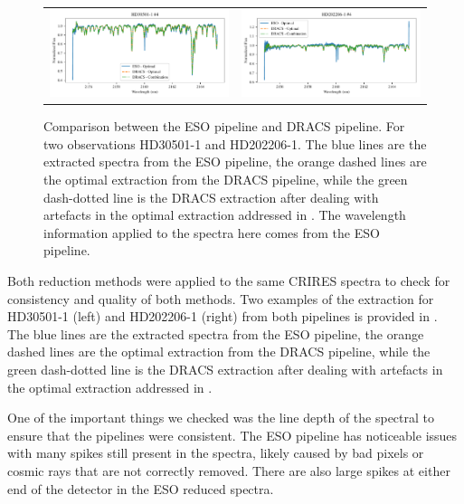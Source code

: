 \begin{figure}
\begin{tabular}{cc}
        \includegraphics[width=0.5\linewidth]{figures/reduction/pipeline_compare/pipeline_compare_HD30501-1_chip_4} & \includegraphics[width=0.5\linewidth]{figures/reduction/pipeline_compare/pipeline_compare_HD202206-1_chip_4}\\
    \end{tabular}
    \caption{Comparison between the ESO pipeline and DRACS pipeline. For two observations HD30501-1 and HD202206-1. The blue lines are the extracted spectra from the ESO pipeline, the orange dashed lines are the optimal extraction from the DRACS pipeline, while the green dash-dotted line is the DRACS extraction after dealing with artefacts in the optimal extraction addressed in . The wavelength information applied to the spectra here comes from the ESO pipeline.}
    \label{fig:reduction-comparison}
\end{figure}

Both reduction methods were applied to the same CRIRES spectra to check for consistency and quality of both methods. Two examples of the extraction for HD30501-1 (left) and HD202206-1 (right) from both pipelines is provided in . The blue lines are the extracted spectra from the ESO pipeline, the orange dashed lines are the optimal extraction from the DRACS pipeline, while the green dash-dotted line is the DRACS extraction after dealing with artefacts in the optimal extraction addressed in .

One of the important things we checked was the line depth of the spectral to ensure that the pipelines were consistent. The ESO pipeline has noticeable issues with many spikes still present in the spectra, likely caused by bad pixels or cosmic rays that are not correctly removed. There are also large spikes at either end of the detector in the ESO reduced spectra.

